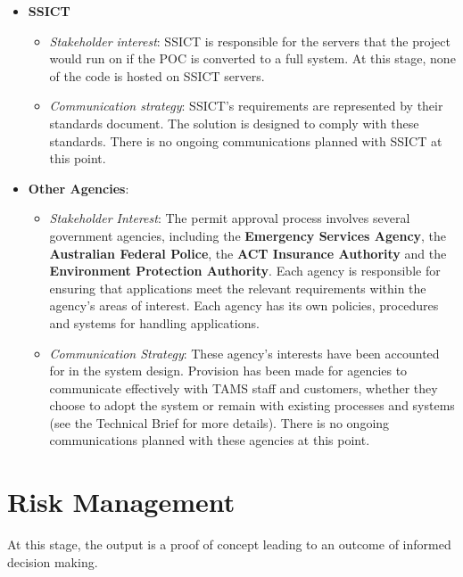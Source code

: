 \documentclass[12pt,a4paper,twosided]{article}
\begin{document}
\begin{itemize}
\itemsep1pt\parskip0pt
\item
  \textbf{SSICT}

  \begin{itemize}
  \itemsep1pt\parskip0pt
  \item
    \emph{Stakeholder interest}: SSICT is responsible for the servers
    that the project would run on if the POC is converted to a full
    system. At this stage, none of the code is hosted on SSICT servers.
  \item
    \emph{Communication strategy}: SSICT's requirements are represented
    by their standards document. The solution is designed to comply with
    these standards. There is no ongoing communications planned with
    SSICT at this point.
  \end{itemize}
\item
  \textbf{Other Agencies}:

  \begin{itemize}
  \itemsep1pt\parskip0pt
  \item
    \emph{Stakeholder Interest}: The permit approval process involves
    several government agencies, including the \textbf{Emergency
    Services Agency}, the \textbf{Australian Federal Police}, the
    \textbf{ACT Insurance Authority} and the \textbf{Environment
    Protection Authority}. Each agency is responsible for ensuring that
    applications meet the relevant requirements within the agency's
    areas of interest. Each agency has its own policies, procedures and
    systems for handling applications.
  \item
    \emph{Communication Strategy}: These agency's interests have been
    accounted for in the system design. Provision has been made for
    agencies to communicate effectively with TAMS staff and customers,
    whether they choose to adopt the system or remain with existing
    processes and systems (see the Technical Brief for more details).
    There is no ongoing communications planned with these agencies at
    this point.
  \end{itemize}
\end{itemize}

\section{Risk Management}

At this stage, the output is a proof of concept leading to an outcome of
informed decision making.
\end{document}
